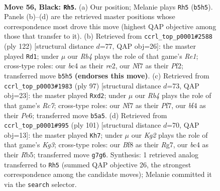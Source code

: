 \documentclass[11pt]{article}
\begin{document}
\clearpage

\begin{figure}[p]\centering
\begin{subfigure}{0.46\textwidth}\centering
\resizebox{\linewidth}{!}{%
\newchessgame
\chessboard[
  setfen={5b1r/p4nkp/P7/1r6/2B2B2/1Pp3KP/R1P3P1/R7 b - - 20 56},
  showmover=false,
  pgfstyle=straightmove, color=movearrow, markmove={b5-h5}
]}
\caption{}
\end{subfigure}\hfill
\begin{subfigure}{0.46\textwidth}\centering
\resizebox{\linewidth}{!}{%
\newchessgame
\chessboard[
  setfen={8/2B3p1/p3rk1p/PbR1p3/8/7P/4rPP1/4R1K1 w - - 56 62},
  showmover=false,
  pgfstyle=straightmove, color=movearrow, markmove={e1-d1}
]}
\caption{}
\end{subfigure}
\\[4pt]
\begin{subfigure}{0.46\textwidth}\centering
\resizebox{\linewidth}{!}{%
\newchessgame
\chessboard[
  setfen={2r5/5p2/4pk2/pB3p2/P4P1b/4PK1P/2rR1P2/3R4 b - - 24 49},
  showmover=false,
  pgfstyle=straightmove, color=movearrow, markmove={c2-d2}
]}
\caption{}
\end{subfigure}\hfill
\begin{subfigure}{0.46\textwidth}\centering
\resizebox{\linewidth}{!}{%
\newchessgame
\chessboard[
  setfen={8/1b4r1/5pk1/Pr2p3/3p3P/P4P1K/1BR3P1/2R5 b - - 6 51},
  showmover=false,
  pgfstyle=straightmove, color=movearrow, markmove={g6-h7}
]}
\caption{}
\end{subfigure}
\caption{\textbf{Move 56, Black: \texttt{Rh5}.} (a) Our position; Melanie plays \texttt{Rh5} (\texttt{b5h5}). Panels (b)--(d) are the retrieved master positions whose correspondence most drove this move (highest QAP objective among those that transfer to it). (b) Retrieved from \texttt{ccrl\_top\_p0001\#2588} (ply 122) [structural distance $d$=77, QAP obj=26]: the master played \texttt{Rd1}; under $\mu$ our \emph{Rb4} plays the role of that game's \emph{Re1}; cross-type roles: our \emph{b}c4 as their \emph{r}e2, our \emph{N}f7 as their \emph{P}f2; transferred move \texttt{b5h5} \textbf{(endorses this move)}. (c) Retrieved from \texttt{ccrl\_top\_p0003\#1983} (ply 97) [structural distance $d$=73, QAP obj=23]: the master played \texttt{Rxd2}; under $\mu$ our \emph{Rb4} plays the role of that game's \emph{Rc7}; cross-type roles: our \emph{N}f7 as their \emph{P}f7, our \emph{b}f4 as their \emph{P}e6; transferred move \texttt{b5a5}. (d) Retrieved from \texttt{ccrl\_top\_p0001\#995} (ply 101) [structural distance $d$=70, QAP obj=13]: the master played \texttt{Kh7}; under $\mu$ our \emph{Kg2} plays the role of that game's \emph{Kg3}; cross-type roles: our \emph{B}f8 as their \emph{R}g7, our \emph{b}c4 as their \emph{R}b5; transferred move \texttt{g7g6}. Synthesis: 1 retrieved analog transferred to \texttt{Rh5} (summed QAP objective 26, the strongest correspondence among the candidate moves); Melanie committed it via the \texttt{search} selector.}
\label{fig:thought-m111}
\end{figure}
\end{document}
